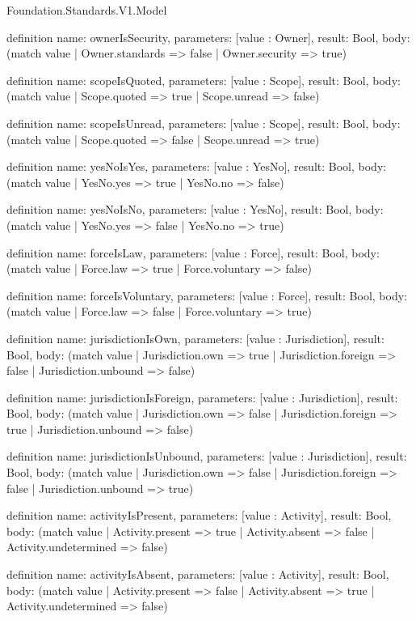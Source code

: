 \begin{lexlean}{Foundation.Standards.V1.Model}
\begin{semanticmodule}
definition{
  name: ownerIsSecurity,
  parameters: [value : Owner],
  result: Bool,
  body: (match value | Owner.standards => false | Owner.security => true)
}

definition{
  name: scopeIsQuoted,
  parameters: [value : Scope],
  result: Bool,
  body: (match value | Scope.quoted => true | Scope.unread => false)
}

definition{
  name: scopeIsUnread,
  parameters: [value : Scope],
  result: Bool,
  body: (match value | Scope.quoted => false | Scope.unread => true)
}

definition{
  name: yesNoIsYes,
  parameters: [value : YesNo],
  result: Bool,
  body: (match value | YesNo.yes => true | YesNo.no => false)
}

definition{
  name: yesNoIsNo,
  parameters: [value : YesNo],
  result: Bool,
  body: (match value | YesNo.yes => false | YesNo.no => true)
}

definition{
  name: forceIsLaw,
  parameters: [value : Force],
  result: Bool,
  body: (match value | Force.law => true | Force.voluntary => false)
}

definition{
  name: forceIsVoluntary,
  parameters: [value : Force],
  result: Bool,
  body: (match value | Force.law => false | Force.voluntary => true)
}

definition{
  name: jurisdictionIsOwn,
  parameters: [value : Jurisdiction],
  result: Bool,
  body: (match value
    | Jurisdiction.own => true
    | Jurisdiction.foreign => false
    | Jurisdiction.unbound => false)
}

definition{
  name: jurisdictionIsForeign,
  parameters: [value : Jurisdiction],
  result: Bool,
  body: (match value
    | Jurisdiction.own => false
    | Jurisdiction.foreign => true
    | Jurisdiction.unbound => false)
}

definition{
  name: jurisdictionIsUnbound,
  parameters: [value : Jurisdiction],
  result: Bool,
  body: (match value
    | Jurisdiction.own => false
    | Jurisdiction.foreign => false
    | Jurisdiction.unbound => true)
}

definition{
  name: activityIsPresent,
  parameters: [value : Activity],
  result: Bool,
  body: (match value
    | Activity.present => true
    | Activity.absent => false
    | Activity.undetermined => false)
}

definition{
  name: activityIsAbsent,
  parameters: [value : Activity],
  result: Bool,
  body: (match value
    | Activity.present => false
    | Activity.absent => true
    | Activity.undetermined => false)
}


\end{semanticmodule}
\end{lexlean}
